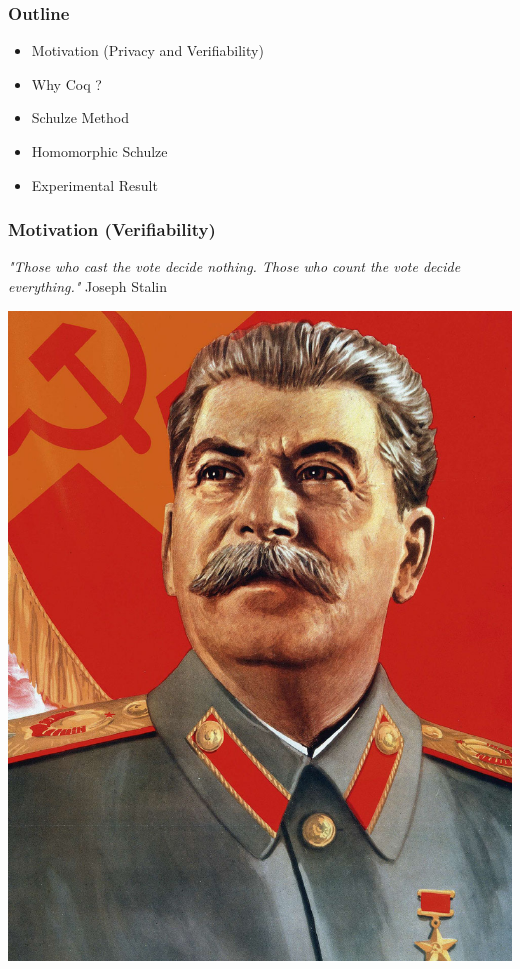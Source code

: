 \documentclass{beamer}
\begin{document}

%

\begin{frame}
\frametitle{Outline}
\begin{itemize}
\item Motivation (Privacy and Verifiability)
\item Why Coq ? 
\item Schulze Method
\item Homomorphic Schulze
\item Experimental Result
\end{itemize}
\end{frame}

\begin{frame}
\frametitle{Motivation (Verifiability)}
\textit{"Those who cast the vote decide nothing.  Those who 
count the vote decide everything."}  Joseph Stalin
\begin{center}
\includegraphics[scale=0.12]{joseph.jpg}
\end{center}
\end{frame}
\end{document}
